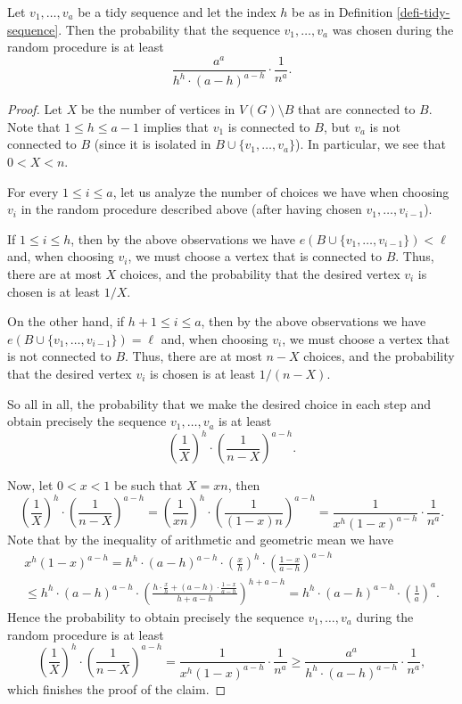 \begin{claim}\label{claim-prob-tidy-seq} Let $v_1,\dots,v_a$ be a tidy sequence and let the index $h$ be as in Definition \ref{defi-tidy-sequence}. Then the probability that the sequence $v_1,\dots,v_a$ was chosen during the random procedure is at least
\[\frac{a^a}{h^h\cdot (a-h)^{a-h}}\cdot \frac{1}{n^a}.\]
\end{claim}
\begin{proof}
Let $X$ be the number of vertices in $V(G)\setminus B$ that are connected to $B$. Note that $1\leq h\leq a-1$ implies that $v_1$ is connected to $B$, but $v_{a}$ is not connected to $B$ (since it is isolated in $B\cup \lbrace v_1,\dots,v_a\rbrace$). In particular, we see that $0<X<n$.

For every $1\leq i\leq a$, let us analyze the number of choices we have when choosing $v_i$ in the random procedure described above (after having chosen $v_1,\dots,v_{i-1}$).

If $1\leq i\leq h$, then by the above observations we have $e(B\cup \lbrace v_1,\dots,v_{i-1}\rbrace)<\ell$ and, when choosing $v_i$, we must choose a vertex that is connected to $B$. Thus, there are at most $X$ choices, and the probability that the desired vertex $v_i$ is chosen is at least $1/X$.

On the other hand, if $h+1\leq i\leq a$, then by the above observations we have $e(B\cup \lbrace v_1,\dots,v_{i-1}\rbrace)=\ell$ and, when choosing $v_i$, we must choose a vertex that is not connected to $B$. Thus, there are at most $n-X$ choices, and the probability that the desired vertex $v_i$ is chosen is at least $1/(n-X)$.

So all in all, the probability that we make the desired choice in each step and obtain precisely the sequence $v_1,\dots,v_a$ is at least
\[\left(\frac{1}{X}\right)^h\cdot \left(\frac{1}{n-X}\right)^{a-h}.\]

Now, let $0<x<1$ be such that $X=xn$, then 
\[\left(\frac{1}{X}\right)^h\cdot \left(\frac{1}{n-X}\right)^{a-h}=\left(\frac{1}{xn}\right)^h\cdot \left(\frac{1}{(1-x)n}\right)^{a-h}=\frac{1}{x^h(1-x)^{a-h}}\cdot \frac{1}{n^a}.\]
Note that by the inequality of arithmetic and geometric mean we have
\begin{multline*}
x^h(1-x)^{a-h}=h^h\cdot (a-h)^{a-h}\cdot\left(\frac{x}{h}\right)^h\cdot\left(\frac{1-x}{a-h}\right)^{a-h}\\
\leq h^h\cdot (a-h)^{a-h}\cdot\left(\frac{h\cdot \frac{x}{h}+(a-h)\cdot \frac{1-x}{a-h}}{h+a-h}\right)^{h+a-h}=h^h\cdot (a-h)^{a-h}\cdot\left(\frac{1}{a}\right)^{a}.
\end{multline*}
Hence the probability to obtain precisely the sequence $v_1,\dots,v_a$ during the random procedure is at least
\[\left(\frac{1}{X}\right)^h\cdot \left(\frac{1}{n-X}\right)^{a-h}=\frac{1}{x^h(1-x)^{a-h}}\cdot \frac{1}{n^a}\geq \frac{a^a}{h^h\cdot (a-h)^{a-h}}\cdot \frac{1}{n^a},\]
which finishes the proof of the claim.
\end{proof}

